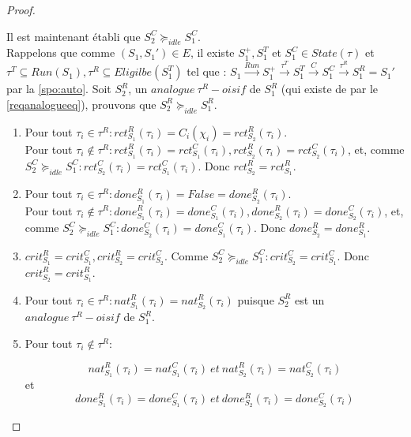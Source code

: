 \documentclass[12pt,a4paper,oneside]{book}
\theoremstyle{break}
\theoremstyle{breakplain}
\begin{document}
\begin{proof}
\begin{enumerate}
\end{enumerate}
Il est maintenant établi que $S^C_2 \succeq_{idle} S^C_1$.\\

Rappelons que comme $(S_1, S_1') \in E$, il existe $S^{+}_1, S^{T}_1$ et $S^{C}_1 \in State(\tau)$ et $\tau^T \subseteq Run(S_1),\tau^R \subseteq Eligilbe(S^{T}_1) $ tel que : $S_1\xrightarrow{Run}S^{+}_1\xrightarrow{\tau^T}S^{T}_1\xrightarrow{C}S^{C}_1\xrightarrow{\tau^R}S_1^R=S_1'$ par la \autoref{spo:auto}. Soit $S_2^R$, un $analogue\ \tau^R-oisif$ de $S_1^R$ (qui existe de par le \autoref{reqanalogueeq}), prouvons que $S_2^R \succeq_{idle} S_1^R$.

\begin{enumerate}
\item Pour tout $\tau_i \in \tau^R : rct_{S_1}^R(\tau_i) = C_i(\chi_i) = rct_{S_2}^R(\tau_i)$.\\
Pour tout $\tau_i \notin \tau^R : rct_{S_1}^R(\tau_i) = rct_{S_1}^C(\tau_i), rct_{S_2}^R(\tau_i) = rct_{S_2}^C(\tau_i)$, et, comme $S^C_2 \succeq_{idle} S^C_1 : rct_{S_2}^C(\tau_i) = rct_{S_1}^C(\tau_i)$. Donc $rct_{S_2}^R = rct_{S_1}^R$.

\item \label{idle:req:done} Pour tout $\tau_i \in \tau^R : done_{S_1}^R(\tau_i) = False = done_{S_2}^R(\tau_i)$.\\
Pour tout $\tau_i \notin \tau^R : done_{S_1}^R(\tau_i) = done_{S_1}^C(\tau_i), done_{S_2}^R(\tau_i) = done_{S_2}^C(\tau_i)$, et, comme $S^C_2 \succeq_{idle} S^C_1 : done_{S_2}^C(\tau_i) = done_{S_1}^C(\tau_i)$. Donc $done_{S_2}^R = done_{S_1}^R$.

\item $crit^R_{S_1} = crit^C_{S_1}, crit^R_{S_2} = crit^C_{S_2}$. Comme $S^C_2 \succeq_{idle} S^C_1 : crit^C_{S_2} = crit^C_{S_1}$. Donc $crit^R_{S_2} = crit^R_{S_1}$.

\item Pour tout $\tau_i \in \tau^R : nat_{S_1}^R(\tau_i) = nat_{S_2}^R(\tau_i)$ puisque $S_2^R$ est un $analogue\ \tau^R-oisif$ de $S_1^R$.

\item Pour tout $\tau_i \notin \tau^R :$

\begin{equation}
\label{idle:eqidleproofnat}
nat_{S_1}^R(\tau_i) = nat_{S_1}^C(\tau_i)\ et\ nat_{S_2}^R(\tau_i) = nat_{S_2}^C(\tau_i)
\end{equation}
et 
\begin{equation}
\label{idle:eqidleproofdone}
done_{S_1}^R(\tau_i) = done_{S_1}^C(\tau_i)\ et\ done_{S_2}^R(\tau_i) = done_{S_2}^C(\tau_i)
\end{equation}


\end{enumerate}
\end{proof}
\end{document}
